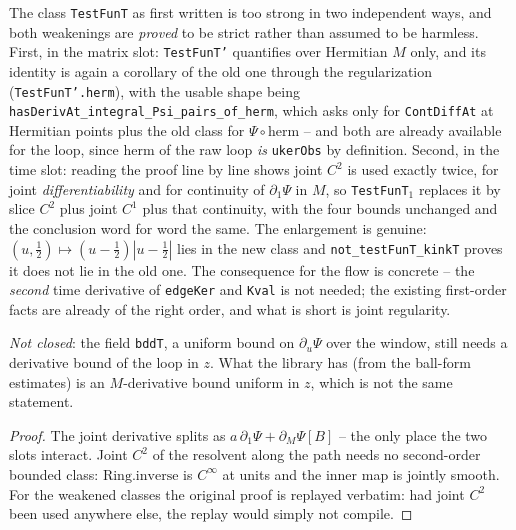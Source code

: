 \begin{lemma}
  The class \texttt{TestFunT} as first written is too strong in two independent ways, and both
  weakenings are \emph{proved} to be strict rather than assumed to be harmless.  First, in the
  matrix slot: \texttt{TestFunT'} quantifies over Hermitian $M$ only, and its identity is again a
  corollary of the old one through the regularization (\texttt{TestFunT'.herm}), with the usable
  shape being \texttt{hasDerivAt\_integral\_Psi\_pairs\_of\_herm}, which asks only for
  \texttt{ContDiffAt} at Hermitian points plus the old class for $\Psi\circ\mathrm{herm}$ -- and
  both are already available for the loop, since $\mathrm{herm}$ of the raw loop \emph{is}
  \texttt{ukerObs} by definition.  Second, in the time slot: reading the proof line by line shows
  joint $C^2$ is used exactly twice, for joint \emph{differentiability} and for continuity of
  $\partial_1\Psi$ in $M$, so \texttt{TestFunT}$_1$ replaces it by slice $C^2$ plus joint $C^1$ plus
  that continuity, with the four bounds unchanged and the conclusion word for word the same.  The
  enlargement is genuine: $(u,\tfrac12)\mapsto(u-\tfrac12)|u-\tfrac12|$ lies in the new class and
  \texttt{not\_testFunT\_kinkT} proves it does not lie in the old one.  The consequence for the
  flow is concrete -- the \emph{second} time derivative of \texttt{edgeKer} and \texttt{Kval} is
  not needed; the existing first-order facts are already of the right order, and what is short is
  joint regularity.

  \emph{Not closed}: the field \texttt{bddT}, a uniform bound on $\partial_u\Psi$ over the window,
  still needs a derivative bound of the loop in $z$.  What the library has (from the ball-form
  estimates) is an $M$-derivative bound uniform in $z$, which is not the same statement.
\end{lemma}
\begin{proof}\leanok
  The joint derivative splits as $a\,\partial_1\Psi+\partial_M\Psi[B]$ -- the only place the two
  slots interact.  Joint $C^2$ of the resolvent along the path needs no second-order bounded
  class: $\mathrm{Ring.inverse}$ is $C^\infty$ at units and the inner map is jointly smooth.
  For the weakened classes the original proof is replayed verbatim: had joint $C^2$ been used
  anywhere else, the replay would simply not compile.
\end{proof}


